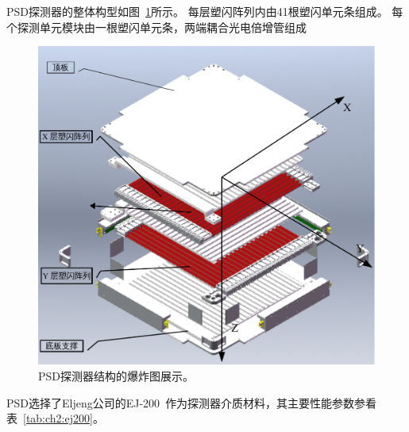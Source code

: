 PSD探测器的整体构型如图~\ref{fig:ch2:psd_explosion}所示。
每层塑闪阵列内由41根塑闪单元条组成。
每个探测单元模块由一根塑闪单元条，两端耦合光电倍增管组成


\begin{figure}
\centering
\includegraphics[width=0.8\linewidth]{chap/description/fig/psd_explosion}
\caption{PSD探测器结构的爆炸图展示。}
\label{fig:ch2:psd_explosion}
\end{figure}


PSD选择了Eljeng公司的EJ-200~\parencite{ej-200}作为探测器介质材料，其主要性能参数参看表~\ref{tab:ch2:ej200}。


